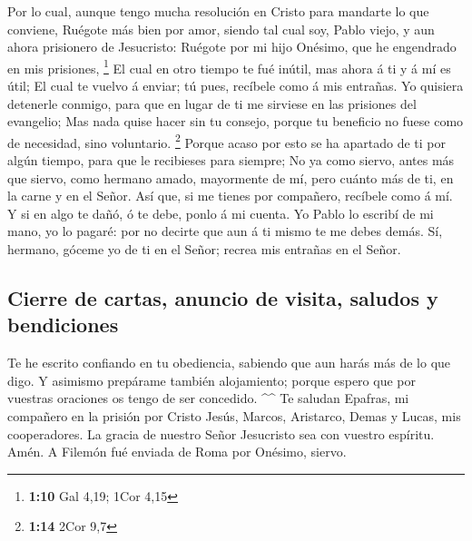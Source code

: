  Por lo cual, aunque tengo mucha resolución en Cristo para
mandarte lo que conviene,  Ruégote más bien por amor, siendo
tal cual soy, Pablo viejo, y aun ahora prisionero de Jesucristo:
 Ruégote por mi hijo Onésimo, que he engendrado en mis
prisiones, \footnote{\textbf{1:10} Gal 4,19; 1Cor 4,15}  El
cual en otro tiempo te fué inútil, mas ahora á ti y á mí es útil;
 El cual te vuelvo á enviar; tú pues, recíbele como á mis
entrañas.  Yo quisiera detenerle conmigo, para que en lugar
de ti me sirviese en las prisiones del evangelio;  Mas nada
quise hacer sin tu consejo, porque tu beneficio no fuese como de
necesidad, sino voluntario. \footnote{\textbf{1:14} 2Cor 9,7}
 Porque acaso por esto se ha apartado de ti por algún
tiempo, para que le recibieses para siempre;  No ya como
siervo, antes más que siervo, como hermano amado, mayormente de mí, pero
cuánto más de ti, en la carne y en el Señor.  Así que, si
me tienes por compañero, recíbele como á mí.  Y si en algo
te dañó, ó te debe, ponlo á mi cuenta.  Yo Pablo lo escribí
de mi mano, yo lo pagaré: por no decirte que aun á ti mismo te me debes
demás.  Sí, hermano, góceme yo de ti en el Señor; recrea
mis entrañas en el Señor.

\hypertarget{cierre-de-cartas-anuncio-de-visita-saludos-y-bendiciones}{%
\subsection{Cierre de cartas, anuncio de visita, saludos y
bendiciones}\label{cierre-de-cartas-anuncio-de-visita-saludos-y-bendiciones}}

 Te he escrito confiando en tu obediencia, sabiendo que aun
harás más de lo que digo.  Y asimismo prepárame también
alojamiento; porque espero que por vuestras oraciones os tengo de ser
concedido. \^{}\^{}  Te saludan Epafras, mi compañero en la
prisión por Cristo Jesús,  Marcos, Aristarco, Demas y
Lucas, mis cooperadores.  La gracia de nuestro Señor
Jesucristo sea con vuestro espíritu. Amén. A Filemón fué enviada de Roma
por Onésimo, siervo.
